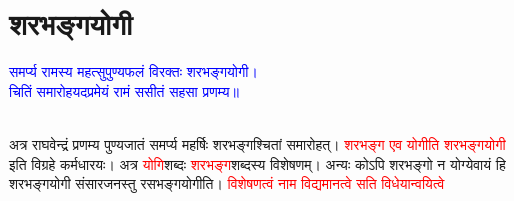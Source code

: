 \section[शरभङ्गयोगी]{शरभङ्गयोगी}
\centering\textcolor{blue}{समर्प्य रामस्य महत्सुपुण्यफलं विरक्तः शरभङ्गयोगी।\nopagebreak\\
चितिं समारोहयदप्रमेयं रामं ससीतं सहसा प्रणम्य॥}\nopagebreak\\
\\
\begin{sloppypar}\justifying\noindent\hspace{10mm} अत्र राघवेन्द्रं प्रणम्य पुण्य\-जातं समर्प्य महर्षिः शरभङ्गश्चितां समारोहत्। \textcolor{red}{शरभङ्ग एव योगीति शरभङ्ग\-योगी} इति विग्रहे कर्मधारयः। अत्र \textcolor{red}{योगि}\-शब्दः \textcolor{red}{शरभङ्ग}\-शब्दस्य विशेषणम्। अन्यः कोऽपि शरभङ्गो न योग्येवायं हि शरभङ्ग\-योगी संसार\-जनस्तु रस\-भङ्ग\-योगीति। \textcolor{red}{विशेषणत्वं नाम विद्यमानत्वे सति विधेयान्वयित्वे
}
\end{sloppypar}
